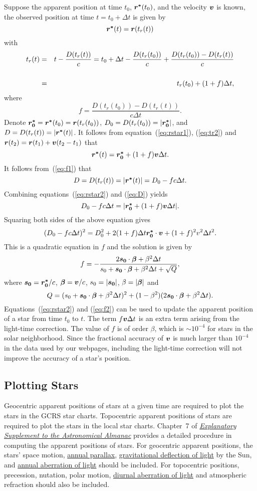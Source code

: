 \documentclass[12pt]{article}
\newcommand \beq {\begin{equation}}
\newcommand \eeq {\end{equation}}
\newcommand \beqn {\begin{eqnarray}}
\newcommand \eeqn {\end{eqnarray}}
\newcommand{\ve}[1]{\mbox{\boldmath $#1$}}
\newcommand{\expl}{\href{http://www.uscibooks.com/urban.htm}{\it Explanatory Supplement to the Astronomical Almanac}}
\begin{document}
Suppose the apparent position at time $t_0$, $\ve{r^*}(t_0)$, and the 
velocity $\ve{v}$ is known, the observed position at time $t=t_0+\Delta t$ 
is given by 
\beq
  \ve{r^*}(t) = \ve{r}(t_r(t))  
\label{eq:rstar1}
\eeq
with 
\beqn
  t_r(t) &=& t - \frac{D(t_r(t))}{c} = t_0 + \Delta t - \frac{D(t_r(t_0))}{c} 
+ \frac{D(t_r(t_0)) - D(t_r(t))}{c} \cr \cr
&=& t_r(t_0) + (1+f) \Delta t ,
\label{eq:tr2}
\eeqn
where 
\beq
  f = \frac{D(t_r(t_0))-D(t_r(t))}{c \Delta t} .
\label{eq:f1}
\eeq
Denote $\ve{r^*_0} = \ve{r^*}(t_0) = \ve{r}(t_r(t_0))$, 
$D_0 = D(t_r(t_0)) = |\ve{r^*_0}|$, 
and $D=D(t_r(t))=|\ve{r^*}(t)|$. It follows from equation~(\ref{eq:rstar1}), 
(\ref{eq:tr2}) and $\ve{r}(t_2) = \ve{r}(t_1) + \ve{v}(t_2-t_1)$ that 
\beq
  \ve{r^*}(t) = \ve{r^*_0} + (1+f)\ve{v} \Delta t .
\label{eq:rstar2}
\eeq
It follows from~(\ref{eq:f1}) that 
\beq
  D = D(t_r(t)) = |\ve{r^*}(t)| = D_0 - f c \Delta t .
\label{eq:D}
\eeq
Combining equations~(\ref{eq:rstar2}) and (\ref{eq:D}) yields 
\beq
  D_0 - f c \Delta t = |\ve{r^*_0} + (1+f)\ve{v} \Delta t| .
\eeq
Squaring both sides of the above equation gives 
\beq
  (D_0 - f c \Delta t)^2 = D_0^2 + 2(1+f)\Delta t \ve{r^*_0} \cdot \ve{v} 
+ (1+f)^2 v^2 \Delta t^2 .
\eeq
This is a quadratic equation in $f$ and the solution is given by 
\beq
  f = -\frac{2 \ve{s_0}\cdot \ve{\beta} + \beta^2 \Delta t}{s_0 + 
\ve{s_0}\cdot \ve{\beta} + \beta^2 \Delta t + \sqrt{Q}} ,
\label{eq:f2}
\eeq
where $\ve{s_0} = \ve{r^*_0}/c$, $\ve{\beta}=\ve{v}/c$, $s_0 = |\ve{s_0}|$, 
$\beta = |\ve{\beta}|$ and 
\beq
  Q = (s_0 + \ve{s_0}\cdot \ve{\beta} + \beta^2 \Delta t)^2 + 
(1-\beta^2)(2\ve{s_0}\cdot \ve{\beta} + \beta^2 \Delta t) .
\eeq
Equations~(\ref{eq:rstar2}) and (\ref{eq:f2}) can be used to update the 
apparent position of a star from time $t_0$ to $t$. The term $f\ve{v}\Delta t$ 
is an extra term arising from the light-time correction. The value of $f$ is 
of order $\beta$, which is $\sim 10^{-4}$ for stars in the solar neighborhood. 
Since the fractional accuracy of $\ve{v}$ is much larger than $10^{-4}$ in the 
data used by our webpages, including the light-time correction will not 
improve the accuracy of a star's position.

\subsection{Plotting Stars} 
\label{sec:plottingStars}

Geocentric apparent positions of stars at a given time are required to plot 
the stars in the GCRS star charts. Topocentric apparent positions of stars 
are required to plot the stars in the local star charts. 
Chapter~7 of \expl{} provides a detailed procedure in computing the apparent 
positions of stars. For geocentric apparent positions, the stars' 
space motion, \href{https://en.wikipedia.org/wiki/Parallax}{annual parallax}, 
\href{http://www.einstein-online.info/spotlights/light_deflection.html}{gravitational 
deflection of light} by the Sun, and \href{https://en.wikipedia.org/wiki/Aberration_of_light}
{annual aberration of light} should be included. 
For topocentric positions, precession, nutation, polar motion, 
\href{https://en.wikipedia.org/wiki/Aberration_of_light}
{diurnal aberration of light} and atmospheric refraction should also be included. 
\end{document}
